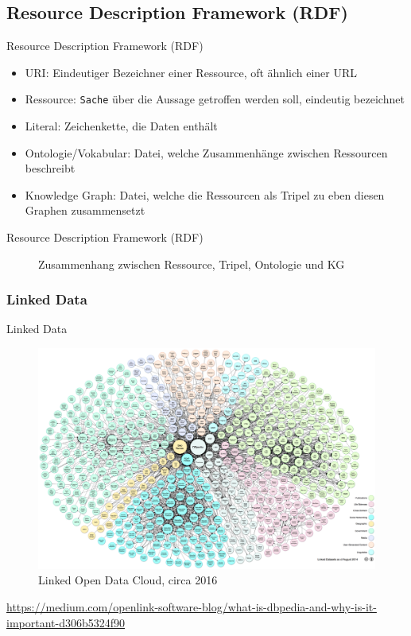 \documentclass{beamer}              %
\begin{document}
\subsection{Resource Description Framework (RDF)}
\begin{frame}{Resource Description Framework (RDF)}
\begin{itemize}
    \item URI: Eindeutiger Bezeichner einer Ressource, oft ähnlich einer URL\cite{blumauer2006semantic}
    \item Ressource: \texttt{\dq Sache\dq} über die Aussage getroffen werden soll, eindeutig bezeichnet\cite{blumauer2006semantic}
    \item Literal: Zeichenkette, die Daten enthält
    \item Ontologie/Vokabular: Datei, welche Zusammenhänge zwischen Ressourcen beschreibt\cite{staab2009handbook}
    \item Knowledge Graph: Datei, welche die Ressourcen als Tripel zu eben diesen Graphen zusammensetzt\cite{staab2009handbook}
\end{itemize}
\end{frame}

\begin{frame}{Resource Description Framework (RDF)}
\begin{figure}[htbp]
  \centering
  
  \caption{Zusammenhang zwischen Ressource, Tripel, Ontologie und KG}
\end{figure}
\end{frame}

\subsubsection{Linked Data}
\begin{frame}{Linked Data}
\begin{figure}[htbp]
  \centering
  \includegraphics[width=0.55\paperwidth]{images/linked-data.png}
  \caption{Linked Open Data Cloud, circa 2016}
\end{figure}
\url{https://medium.com/openlink-software-blog/what-is-dbpedia-and-why-is-it-important-d306b5324f90}
\end{frame}
\end{document}
